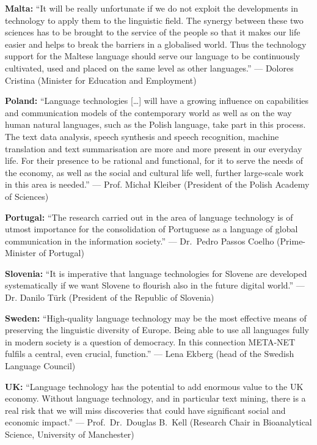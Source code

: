\documentclass[10pt, plain]{../../metanetpaper}
\begin{document}
\bigskip \textbf{Malta:} ``It will be really unfortunate if we do not exploit the developments in technology to apply them to the linguistic field. The synergy between these two sciences has to be brought to the service of the people so that it makes our life easier and helps to break the barriers in a globalised world. Thus the technology support for the Maltese language should serve our language to be continuously cultivated, used and placed on the same level as other languages.'' --- Dolores Cristina (Minister for Education and Employment)

\bigskip \textbf{Poland:} ``Language technologies [\dots] will have a growing influence on capabilities and communication models of the contemporary world as well as on the way human natural languages, such as the Polish language, take part in this process. The text data analysis, speech synthesis and speech recognition, machine translation and text summarisation are more and more present in our everyday life. For their presence to be rational and functional, for it to serve the needs of the economy, as well as the social and cultural life well, further large-scale work in this area is needed.'' --- Prof. Michał Kleiber (President of the Polish Academy of Sciences)

\bigskip \textbf{Portugal:} ``The research carried out in the area of language technology is of utmost importance for the consolidation of Portuguese as a language of global communication in the information society.'' --- Dr.~Pedro Passos Coelho (Prime-Minister of Portugal)

\bigskip \textbf{Slovenia:} ``It is imperative that language technologies for Slovene are developed systematically if we want Slovene to flourish also in the future digital world.'' --- Dr. Danilo Türk (President of the Republic of Slovenia)

\bigskip \textbf{Sweden:} ``High-quality language technology may be the most effective means of preserving the linguistic diversity of Europe. Being able to use all languages fully in modern society is a question of democracy. In this connection META-NET fulfils a central, even crucial, function.'' --- Lena Ekberg (head of the Swedish Language Council)

\bigskip \textbf{UK:} ``Language technology has the potential to add enormous value to the UK economy. Without language technology, and in particular text mining, there is a real risk that we will miss discoveries that could have significant social and economic impact.'' --- Prof.~Dr.~Douglas B.~Kell (Research Chair in Bioanalytical Science, University of Manchester)
\end{document}
